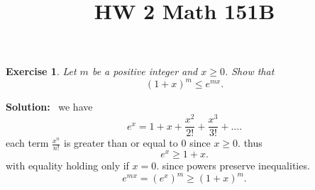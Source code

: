\documentclass[a4paper,12pt]{scrartcl} %
\newenvironment{solution}
  {\par\color{answercolor}\textbf{Solution:}\ }
  {\par}
\newcounter{customcounter}
\theoremstyle{darktheorem}
\newtheorem{exercise}[customcounter]{Exercise}
\begin{document}
\title{\color{sectioncolor}HW 2 Math 151B}
\author{}
\date{}
\maketitle

\thispagestyle{fancy}

\begin{exercise}
    Let $m$ be a positive integer and $x \ge 0$. Show that
    \[
        (1+x)^{m} \le e^{mx}
    .\] 
\end{exercise}
\begin{solution}
    we have
    \[
    e^{x} = 1 + x + \frac{x^2}{2!} + \frac{x^{3}}{3!} + ... 
    .\] 
    each term $\frac{x^{n}}{n!}$ is greater than or equal to $0$ since $x \ge 0$. thus
    \[
    e^{x} \ge 1 + x
    .\] 
    with equality holding only if $x = 0$.
    since powers preserve inequalities.
    \[
        e^{mx} = (e^{x})^{m} \ge (1+x)^{m}
    .\] 
\end{solution}
\end{document}
